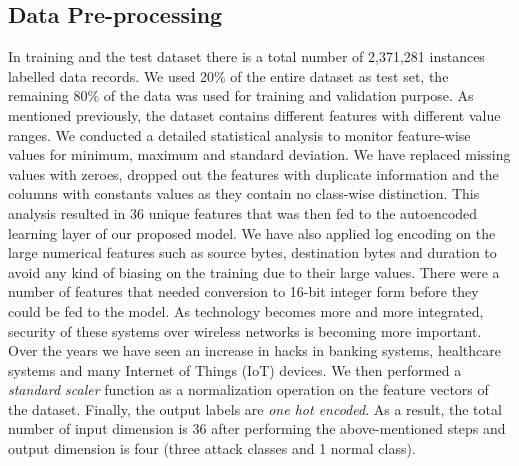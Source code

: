\documentclass[letterpaper, 10pt, conference]{ieeeconf} %
\begin{document}
\subsection{Data Pre-processing}

In training and the test dataset there is a total number of 2,371,281 instances labelled data records. We used 20\% of the entire dataset as test set, the remaining 80\% of the data was used for training and validation purpose. As mentioned previously, the dataset contains different features with different value ranges. We conducted a detailed statistical analysis to monitor feature-wise values for minimum, maximum and standard deviation. We have replaced missing values with zeroes, dropped out the features with duplicate information and the columns with constants values as they contain no class-wise distinction. This analysis resulted in 36 unique features that was then fed to the autoencoded learning layer of our proposed model. We have also applied log encoding on the large numerical features such as source bytes, destination bytes and duration to avoid any kind of biasing on the training due to their large values. There were a number of features that needed conversion to 16-bit integer form  before they could be fed to the model.  As technology becomes more and more integrated, security of these systems over wireless networks is becoming more important. Over the years we have seen an increase in hacks in banking systems, healthcare systems and many Internet of Things (IoT) devices. We then performed a \emph{standard scaler} function as a normalization operation on the feature vectors of the dataset. Finally, the output labels are \emph{one hot encoded}. As a result, the total number of input dimension is 36 after performing the above-mentioned steps and output dimension is four (three attack classes and 1 normal class).  
\end{document}
